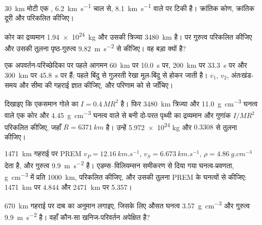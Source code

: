 \begin{exercise}[$\star$]\label{exo:b1:layered-earth:3}
\qty{30}{km} मोटी एक , \qty{6.2}{km.s^{-1}} चाल से, \qty{8.1}{km.s^{-1}} वाले  पर टिकी है। क्रांतिक कोण, क्रांतिक दूरी और  परिकलित कीजिए।
\end{exercise}

\begin{exercise}[$\star$]\label{exo:b1:layered-earth:4}
कोर का द्रव्यमान \qty{1.94e24}{kg} और उसकी त्रिज्या \qty{3480}{km} है।  पर गुरुत्व परिकलित कीजिए और उसकी तुलना पृष्ठ-गुरुत्व \qty{9.82}{m.s^{-2}} से कीजिए। वह बड़ा क्यों है?
\end{exercise}

\begin{exercise}[$\star\star$]\label{exo:b1:layered-earth:5}
एक अपवर्तन-परिच्छेदिका पर पहले आगमन \qty{60}{km} पर \qty{10.0}{s} पर, \qty{200}{km} पर \qty{33.3}{s} पर और \qty{300}{km} पर \qty{45.8}{s} पर हैं; पहले बिंदु से गुज़रती रेखा मूल-बिंदु से होकर जाती है। $v_1$, $v_2$, अंतःखंड-समय और सीमा की गहराई ज्ञात कीजिए, और परिणाम को  से जाँचिए।
\end{exercise}

\begin{exercise}[$\star\star$]\label{exo:b1:layered-earth:6}
दिखाइए कि एकसमान गोले का $I = 0.4\,MR^2$ है। फिर \qty{3480}{km} त्रिज्या और \qty{11.0}{g.cm^{-3}} घनत्व वाले एक कोर और \qty{4.45}{g.cm^{-3}} घनत्व वाले  से बनी दो-परत पृथ्वी का द्रव्यमान और गुणांक $I/MR^2$ परिकलित कीजिए, जहाँ $R = \qty{6371}{km}$ है। उन्हें \num{5.972e24} kg और $0.3308$ से तुलना कीजिए।
\end{exercise}

\begin{exercise}[$\star\star$]\label{exo:b1:layered-earth:7}
\qty{1471}{km} गहराई पर PREM $v_P = \qty{12.16}{km.s^{-1}}$, $v_S = \qty{6.673}{km.s^{-1}}$, $\rho = \qty{4.86}{g.cm^{-3}}$ देता है, और गुरुत्व \qty{9.9}{m.s^{-2}} है। एडम्स–विलियम्सन समीकरण से दिया गया घनत्व-प्रवणता, \unit{g.cm^{-3}} में प्रति \qty{1000}{km}, परिकलित कीजिए, और उसकी तुलना PREM के घनत्वों से कीजिए: \qty{1471}{km} पर \num{4.844} और \qty{2471}{km} पर \num{5.357}।
\end{exercise}

\begin{exercise}[$\star\star$]\label{exo:b1:layered-earth:8}
\qty{670}{km} गहराई पर दाब का अनुमान लगाइए, जिसके लिए औसत घनत्व \qty{3.57}{g.cm^{-3}} और गुरुत्व \qty{9.9}{m.s^{-2}} है। वहाँ कौन-सा खनिज-परिवर्तन अपेक्षित है?
\end{exercise}

